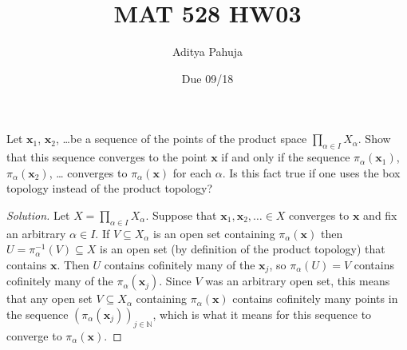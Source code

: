\documentclass[10pt]{article}
\title{MAT 528 HW03}
\author{\large Aditya Pahuja}
\date{\large Due 09/18}
\providecommand{\NN}{\mathbb N}
\providecommand{\inv}{^{-1}}
\providecommand{\mb}[1]{\mathbf{#1}}
\newenvironment{soln}{\begin{proof}[Solution]}{\end{proof}}
\begin{document}
\maketitle

\begin{problem}
    [Munkres 19.6]
    Let $\mb x_1$, $\mb x_2$, \dots be a sequence of the points
    of the product space $\prod_{\alpha\in I} X_\alpha$. Show that this sequence
    converges to the point $\mb x$ if and only if
    the sequence $\pi_\alpha(\mb x_1)$, $\pi_\alpha(\mb x_2)$, \dots
    converges to $\pi_\alpha(\mb x)$ for each $\alpha$.
    Is this fact true if one uses the box topology
    instead of the product topology?
\end{problem}

\begin{soln}
    Let $X = \prod_{\alpha\in I} X_\alpha$.
    Suppose that $\mb x_1, \mb x_2, \dots\in X$ converges to $\mb x$
    and fix an arbitrary $\alpha\in I$.
    If $V\subseteq X_\alpha$ is an open set containing $\pi_\alpha(\mb x)$
    then $U = \pi_\alpha\inv(V)\subseteq X$ is an open set
    (by definition of the product topology) that contains $\mb x$.
    Then $U$ contains cofinitely many of the $\mb x_j$,
    so $\pi_\alpha(U) = V$ contains cofinitely many of the $\pi_\alpha(\mb x_j)$.
    Since $V$ was an arbitrary open set, this means that any open set
    $V\subseteq X_\alpha$ containing $\pi_\alpha(\mb x)$
    contains cofinitely many points in the sequence
    $(\pi_\alpha(\mb x_j))_{j\in\NN}$, which is what it means for
    this sequence to converge to $\pi_\alpha(\mb x)$.


\end{soln}
\end{document}
